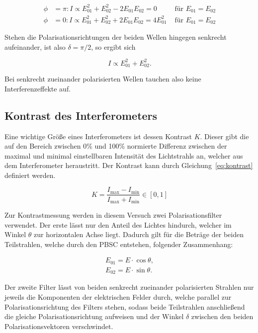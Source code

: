 \begin{align}
\phi &= \pi : I\propto E_{01}^2 + E_{02}^2 - 2E_{01}E_{02}
= 0 &\text{ für } E_{01}=E_{02}\\
\phi &= 0 : I\propto E_{01}^2 + E_{02}^2 + 2E_{01}E_{02}
= 4E_{01}^2 &\text{ für } E_{01}=E_{02}
\end{align}

Stehen die Polarisationsrichtungen der beiden Wellen hingegen senkrecht aufeinander, ist also $\delta = \pi/2$, so ergibt sich

\begin{equation}
I \propto E_{01}^2 + E_{02}^2.
\end{equation}

Bei senkrecht zueinander polarisierten Wellen tauchen also keine Interferenzeffekte auf.


\subsection{Kontrast des Interferometers}
Eine wichtige Größe eines Interferometers ist dessen Kontrast $K$. Dieser gibt die auf den Bereich zwischen 0\% und 100\% normierte Differenz zwischen der maximal und minimal einstellbaren Intensität des Lichtstrahls an, welcher aus dem Interferometer heraustritt. Der Kontrast kann durch Gleichung~\eqref{eq:kontrast} definiert werden.

\begin{equation}
K = \frac{I_\text{max}-I_\text{min}}{I_\text{max}+I_\text{min}} \in [0,1]
\label{eq:kontrast}
\end{equation}

Zur Kontrastmessung werden in diesem Versuch zwei Polarisationsfilter verwendet. Der erste lässt nur den Anteil des Lichtes hindurch, welcher im Winkel $\theta$ zur horizontalen Achse liegt. Dadurch gilt für die Beträge der beiden Teilstrahlen, welche durch den PBSC entstehen, folgender Zusammenhang:

\begin{align*}
E_{01}=E\cdot\cos \theta,\\
E_{02}=E\cdot\sin \theta.
\end{align*}

Der zweite Filter lässt von beiden senkrecht zueinander polarisierten Strahlen nur jeweils die Komponenten der elektrischen Felder durch, welche parallel zur Polarisationsrichtung des Filters stehen, sodass beide Teilstrahlen anschließend die gleiche Polarisationsrichtung aufweisen und der Winkel $\delta$ zwischen den beiden Polarisationsvektoren verschwindet.


